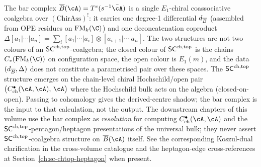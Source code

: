 \begin{remark}
\label{rem:bar-not-sc-coalgebra}%
%
%
The bar complex $\barB(\cA) = T^c(s^{-1}\bar\cA)$ is a single
$E_1$-chiral coassociative coalgebra over $(\mathrm{ChirAss})^!$:
it carries one degree-1 differential $d_{\overline{B}}$ (assembled
from OPE residues on $\FM_k(\C)$) and one
deconcatenation coproduct
$\Delta[a_1|\cdots|a_n] = \sum_{i} [a_1|\cdots|a_i] \otimes
[a_{i+1}|\cdots|a_n]$.
The two structures are not two colours of an $\mathsf{SC}^{\mathrm{ch},\mathrm{top}}$-coalgebra;
the closed colour of $\mathsf{SC}^{\mathrm{ch},\mathrm{top}}$ is the chains
$C_\ast(\FM_k(\C))$ on configuration space, the open colour is
$E_1(m)$, and the data $(d_{\overline{B}}, \Delta)$ does not
constitute a parametrised pair over these spaces. The
$\mathsf{SC}^{\mathrm{ch},\mathrm{top}}$ structure emerges on the chain-level chiral
Hochschild/open pair
$\bigl(C^\bullet_{\mathrm{ch}}(\cA, \cA),\, \cA\bigr)$ where
the Hochschild bulk acts on the algebra (closed-on-open).
Passing to cohomology gives the derived-centre shadow; the bar
complex is the input to that calculation, not the output.
The downstream chapters of this volume use the bar complex as
\emph{resolution} for computing
$C^\bullet_{\mathrm{ch}}(\cA,\cA)$ and the
$\mathsf{SC}^{\mathrm{ch},\mathrm{top}}$-pentagon/heptagon presentations of the universal
bulk; they never assert $\mathsf{SC}^{\mathrm{ch},\mathrm{top}}$-coalgebra structure on
$\barB(\cA)$ itself. See the corresponding Koszul-dual clarification in the cross-volume catalogue and the heptagon-edge cross-references at
Section~\ref{ch:sc-chtop-heptagon} when present.
\end{remark}

